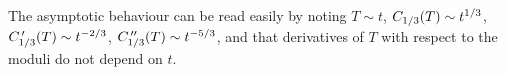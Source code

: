 The asymptotic behaviour can be read easily by noting $T \sim t$, $C_{1/3}(T) \sim t^{1/3}$, $C_{1/3}^{\,\prime}(T) \sim t^{-2/3}$, $C_{1/3}^{\,\prime\prime}(T) \sim t^{-5/3}$, and that derivatives of $T$ with respect to the moduli do not depend on $t$.

%
%
%
%
%
%
%
%
%
%

%


